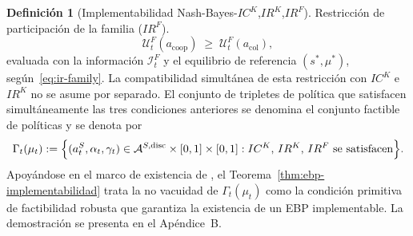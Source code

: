 \documentclass[review,authoryear,12pt]{elsarticle}
\theoremstyle{plain}
\theoremstyle{definition}
\newtheorem{definition}[theorem]{Definición}
\newcommand{\1}{\mathbf{1}}
\begin{document}
\begin{definition}[Implementabilidad Nash-Bayes-$IC^K$,$IR^K$,$IR^F$]
\smallskip
\noindent Restricción de participación de la familia \textup{(}$IR^F$\textup{)}.
\[
\mathcal{U}^F_t(a_{\mathrm{coop}})\;\ge\;\mathcal{U}^F_t(a_{\mathrm{col}}),
\]
evaluada con la información $\mathcal{I}_t^F$ y el equilibrio de referencia $(s^\ast,\mu^\ast)$, según~\eqref{eq:ir-family}.
La compatibilidad simultánea de esta restricción con $IC^K$ e $IR^K$ no se asume por separado. El conjunto de tripletes de política que satisfacen simultáneamente las tres condiciones anteriores se denomina el conjunto factible de políticas y se denota por
\begin{equation}
\label{eq:gamma-factible}
\Gamma_t(\mu_t)
:=\Bigl\{(a_t^S,\alpha_t,\gamma_t)\in
\mathcal{A}^{S,\mathrm{disc}}\times[0,1]\times[0,1] :
IC^K,\,IR^K,\,IR^F
\text{ se satisfacen}\Bigr\}.
\end{equation}
Apoyándose en el marco de existencia de \citet{KadanRenySwinkels2017}, el Teorema~\ref{thm:ebp-implementabilidad} trata la no vacuidad de $\Gamma_t(\mu_t)$ como la condición primitiva de factibilidad robusta que garantiza la existencia de un EBP implementable. La demostración se presenta en el Apéndice~B.
\end{definition}
\end{document}
